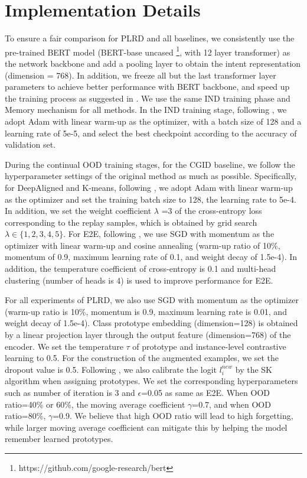 \documentclass[11pt]{article}
\begin{document}
\section{Implementation Details}
\label{app:implementation}
To ensure a fair comparison for PLRD and all baselines, we consistently use the pre-trained BERT model (BERT-base uncased \footnote{https://github.com/google-research/bert}, with 12 layer transformer) as the network backbone and add a pooling layer to obtain the intent representation (dimension = 768). In addition, we freeze all but the last transformer layer parameters to achieve better performance with BERT backbone, and speed up the training process as suggested in \citet{lin2020discovering}. We use the same IND training phase and Memory mechanism for all methods. In the IND training stage, following \citet{zhang2021discovering}, we adopt Adam with linear warm-up as the optimizer, with a batch size of 128 and a learning rate of 5e-5, and select the best checkpoint according to the accuracy of  validation set. %

During the continual OOD training stages, for the CGID baseline, we follow the hyperparameter settings of the original method as much as possible. Specifically, for DeepAligned and K-means, following \citet{zhang2021discovering}, we adopt Adam with linear warm-up as the optimizer and set the training batch size to 128, the learning rate to 5e-4. In addition, we set the weight coefficient $\lambda$ =3 of the cross-entropy loss corresponding to the replay samples, which is obtained by grid search $\lambda \in\{1,2,3,4,5\}$. For E2E, following \citet{mou-etal-2022-generalized}, we use SGD with momentum as the optimizer with linear warm-up and cosine annealing (warm-up ratio of 10\%, momentum of 0.9, maximum learning rate of 0.1, and weight decay of 1.5e-4). In addition, the temperature coefficient of cross-entropy is 0.1 and multi-head clustering (number of heads is 4) is used to improve performance for E2E.

For all experiments of PLRD, we also use SGD with momentum as the optimizer (warm-up ratio is 10\%, momentum is 0.9, maximum learning rate is 0.01, and weight decay of 1.5e-4). Class prototype embedding (dimension=128) is obtained by a linear projection layer through the output feature (dimension=768) of the encoder. We set the temperature $\tau$ of prototype and instance-level contrastive learning to 0.5. For the construction of the augmented examples, we  set the dropout value is 0.5. Following \cite{mou-etal-2022-generalized}, we also calibrate the logit $l^{new}_i$ by the SK algorithm \cite{cuturi2013sinkhorn} when assigning prototypes. We set the corresponding hyperparameters such as number of iteration is 3 and $\epsilon$=0.05 as same as E2E. When OOD ratio=40\% or 60\%, the moving average coefficient $\gamma$=0.7, and when OOD ratio=80\%, $\gamma$=0.9. We believe that high OOD ratio will lead to high forgetting, while larger moving average coefficient can mitigate this by helping the model remember learned prototypes.
\end{document}
